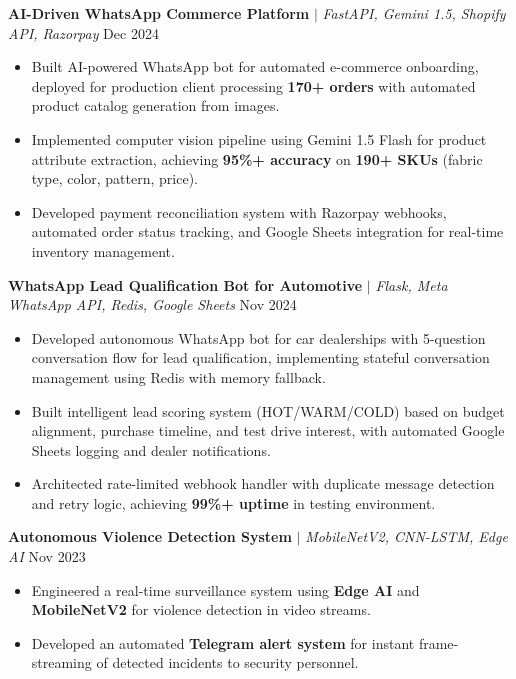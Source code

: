\documentclass[a4paper,10pt]{article}
\begin{document}
\textbf{AI-Driven WhatsApp Commerce Platform} $|$ \textit{FastAPI, Gemini 1.5, Shopify API, Razorpay} \hfill Dec 2024 \\
\begin{itemize}[leftmargin=0.15in, label={$\bullet$}, itemsep=0pt, parsep=2pt]
    \item Built AI-powered WhatsApp bot for automated e-commerce onboarding, deployed for production client processing \textbf{170+ orders} with automated product catalog generation from images.
    \item Implemented computer vision pipeline using Gemini 1.5 Flash for product attribute extraction, achieving \textbf{95\%+ accuracy} on \textbf{190+ SKUs} (fabric type, color, pattern, price).
    \item Developed payment reconciliation system with Razorpay webhooks, automated order status tracking, and Google Sheets integration for real-time inventory management.
\end{itemize}

\textbf{WhatsApp Lead Qualification Bot for Automotive} $|$ \textit{Flask, Meta WhatsApp API, Redis, Google Sheets} \hfill Nov 2024 \\
\begin{itemize}[leftmargin=0.15in, label={$\bullet$}, itemsep=0pt, parsep=2pt]
    \item Developed autonomous WhatsApp bot for car dealerships with 5-question conversation flow for lead qualification, implementing stateful conversation management using Redis with memory fallback.
    \item Built intelligent lead scoring system (HOT/WARM/COLD) based on budget alignment, purchase timeline, and test drive interest, with automated Google Sheets logging and dealer notifications.
    \item Architected rate-limited webhook handler with duplicate message detection and retry logic, achieving \textbf{99\%+ uptime} in testing environment.
\end{itemize}

\textbf{Autonomous Violence Detection System} $|$ \textit{MobileNetV2, CNN-LSTM, Edge AI} \hfill Nov 2023 \\
\begin{itemize}[leftmargin=0.15in, label={$\bullet$}, itemsep=0pt, parsep=2pt]
    \item Engineered a real-time surveillance system using \textbf{Edge AI} and \textbf{MobileNetV2} for violence detection in video streams.
    \item Developed an automated \textbf{Telegram alert system} for instant frame-streaming of detected incidents to security personnel.
\end{itemize}
\end{document}
